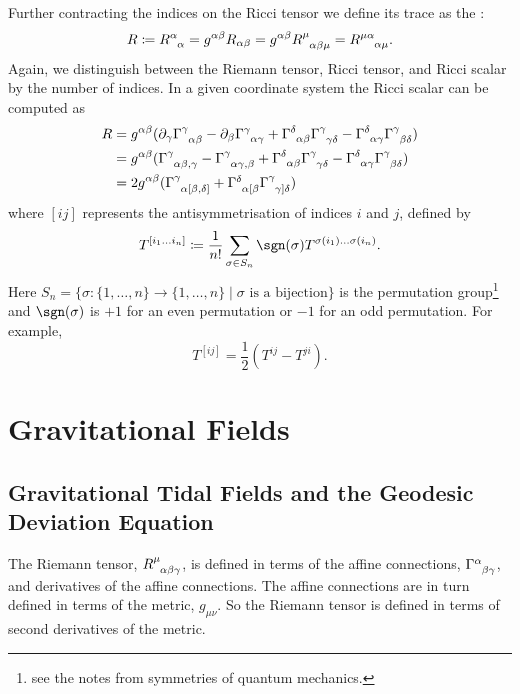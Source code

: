 \documentclass[fleqn]{NotesClass}
\newcommand*{\christoffel}[3]{\tensor{\Gamma}{^{#1}_{{#2}{#3}}}}
\begin{document}
    Further contracting the indices on the Ricci tensor we define its trace as the :
    \begin{equation}
        R \coloneqq \tensor{R}{^\alpha_\alpha} = g^{\alpha\beta}R_{\alpha\beta} = g^{\alpha\beta}\tensor{R}{^\mu_{\alpha\beta\mu}} = \tensor{R}{^{\mu\alpha}_{\alpha\mu}}.
    \end{equation}
    Again, we distinguish between the Riemann tensor, Ricci tensor, and Ricci scalar by the number of indices.
    In a given coordinate system the Ricci scalar can be computed as
    \begin{align}
        R &= g^{\alpha\beta} (\partial_\gamma \christoffel{\gamma}{\alpha}{\beta} - \partial_\beta\christoffel{\gamma}{\alpha}{\gamma} + \christoffel{\delta}{\alpha}{\beta}\christoffel{\gamma}{\gamma}{\delta} - \christoffel{\delta}{\alpha}{\gamma}\christoffel{\gamma}{\beta}{\delta})\\
        &= g^{\alpha\beta} (\christoffel{\gamma}{\alpha}{\beta,\gamma} - \christoffel{\gamma}{\alpha}{\gamma,\beta} + \christoffel{\delta}{\alpha}{\beta} \christoffel{\gamma}{\gamma}{\delta} - \christoffel{\delta}{\alpha}{\gamma}\christoffel{\gamma}{\beta}{\delta})\\
        &= 2 g^{\alpha\beta}(\tensor{\Gamma}{^\gamma_{\alpha[\beta,\delta]}} + \tensor{\Gamma}{^{\raisebox{-1.2pt}{\scriptsize\(\delta\)}\vphantom{\gamma}}_{\alpha[\beta}}\tensor{\Gamma}{^\gamma_{\gamma]\delta}})
    \end{align}
    where \([ij]\) represents the antisymmetrisation of indices \(i\) and \(j\), defined by
    \begin{equation}
        T^{[i_1\dotso i_n]} \coloneqq \frac{1}{n!} \sum_{\sigma \in S_n} \sgn(\sigma) T^{\sigma(i_1) \dotso \sigma(i_n)}.
    \end{equation}
    Here \(S_n = \{\sigma\colon \{1, \dotsc, n\} \to \{1, \dotsc, n\} \mid \sigma \text{ is a bijection}\}\) is the permutation group\footnote{see the notes from symmetries of quantum mechanics.} and \(\sgn(\sigma)\) is \(+1\) for an even permutation or \(-1\) for an odd permutation.
    For example, 
    \begin{equation}
        T^{[ij]} = \frac{1}{2}(T^{ij} - T^{ji}).
    \end{equation}
    
    \chapter{Gravitational Fields}
    \section{Gravitational Tidal Fields and the Geodesic Deviation Equation}
    The Riemann tensor, \(\tensor{R}{^\mu_{\alpha\beta\gamma}}\), is defined in terms of the affine connections, \(\christoffel{\alpha}{\beta}{\gamma}\), and derivatives of the affine connections.
    The affine connections are in turn defined in terms of the metric, \(g_{\mu\nu}\).
    So the Riemann tensor is defined in terms of second derivatives of the metric.
    
\end{document}
